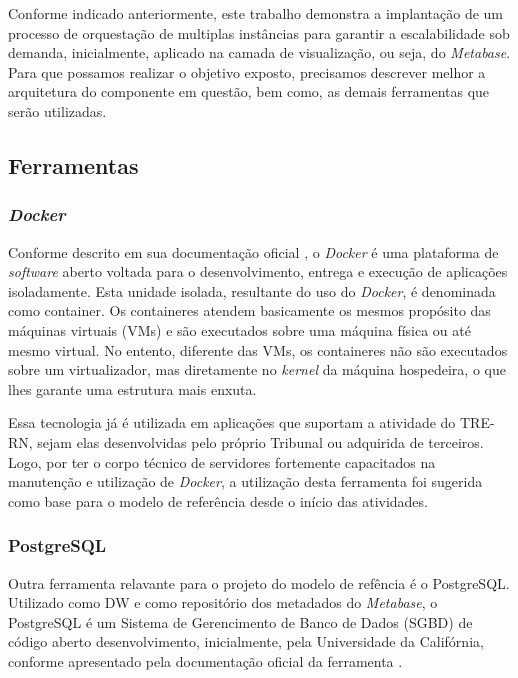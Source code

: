 Conforme indicado anteriormente, este trabalho demonstra a implantação de um processo de orquestação de multiplas instâncias para garantir a escalabilidade sob demanda, inicialmente, aplicado na camada de visualização, ou seja, do \textit{Metabase}. Para que possamos realizar o objetivo exposto, precisamos descrever melhor a arquitetura do componente em questão, bem como, as demais ferramentas que serão utilizadas. 

\subsection{Ferramentas}

\subsubsection{\textit{Docker}}

Conforme descrito em sua documentação oficial \cite{dockerDoc}, o \textit{Docker} é uma plataforma de \textit{software} aberto voltada para o desenvolvimento, entrega e execução de aplicações isoladamente. Esta unidade isolada, resultante do uso do \textit{Docker}, é denominada como container. Os containeres atendem basicamente os mesmos propósito das máquinas virtuais (VMs) e são executados sobre uma máquina física ou até mesmo virtual. No entento, diferente das VMs, os containeres não são executados sobre um virtualizador, mas diretamente no \textit{kernel} da máquina hospedeira, o que lhes garante uma estrutura mais enxuta.

Essa tecnologia já é utilizada em aplicações que suportam a atividade do TRE-RN, sejam elas desenvolvidas pelo próprio Tribunal ou adquirida de terceiros. Logo, por ter o corpo técnico de servidores fortemente capacitados na manutenção e utilização de \textit{Docker}, a utilização desta ferramenta foi sugerida como base para o modelo de referência desde o início das atividades.

\subsubsection{PostgreSQL}

Outra ferramenta relavante para o projeto do modelo de refência é o PostgreSQL. Utilizado como DW e como repositório dos metadados do \textit{Metabase}, o PostgreSQL é um Sistema de Gerencimento de Banco de Dados (SGBD) de código aberto desenvolvimento, inicialmente, pela Universidade da Califórnia, conforme apresentado pela documentação oficial da ferramenta \cite{postgresDoc}.

